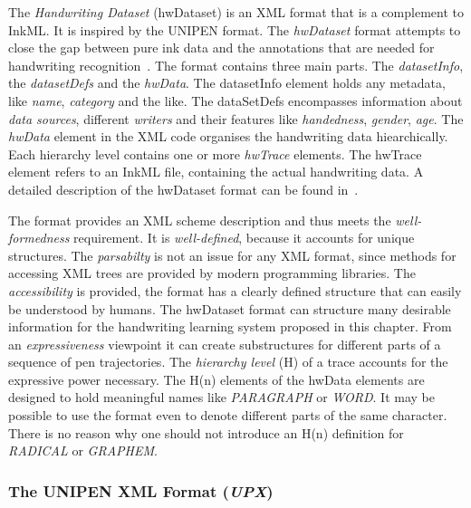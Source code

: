 The \emph{Handwriting Dataset} (hwDataset) is an XML format that is a complement
to InkML. It is inspired by the UNIPEN format. The \emph{hwDataset} format 
attempts to close the gap between pure ink data and the annotations that are 
needed for handwriting recognition~. 
The format contains three main parts. The \emph{datasetInfo}, 
the \emph{datasetDefs} and the \emph{hwData}. The datasetInfo element holds
any metadata, like \emph{name}, \emph{category} and the like.
The dataSetDefs encompasses information about \emph{data sources}, different
\emph{writers} and their features like \emph{handedness}, \emph{gender}, 
\emph{age}. The \emph{hwData} element in the XML code organises the 
handwriting data hiearchically. Each hierarchy level contains one or 
more \emph{hwTrace} elements. The hwTrace element refers to an InkML file, 
containing the actual handwriting data. A detailed description of the hwDataset 
format can be found in~. 

The format provides an XML scheme description and thus meets the 
\emph{well-formedness} requirement. It is \emph{well-defined}, 
because it accounts for unique structures. The \emph{parsabilty} is not an 
issue for any XML format, since methods for accessing XML trees are provided 
by modern programming libraries.
The \emph{accessibility} is provided, the format has a clearly defined structure
that can easily be understood by humans.
The hwDataset format can structure many desirable information for the handwriting
learning system proposed in this chapter. 
From an \emph{expressiveness} viewpoint it can create substructures for 
different parts of a sequence of pen trajectories. The \emph{hierarchy level} (H)
of a trace accounts for the expressive power necessary. The H(n) elements 
of the hwData elements are designed to hold meaningful names like 
\emph{PARAGRAPH} or \emph{WORD}. It may be possible to use the format even to 
denote different parts of the same character. There is no reason why one should
not introduce an H(n) definition for \emph{RADICAL} or \emph{GRAPHEM}.

\subsubsection{The UNIPEN XML Format (\emph{UPX})}
\label{sec:hwre:unipenformatupx}

